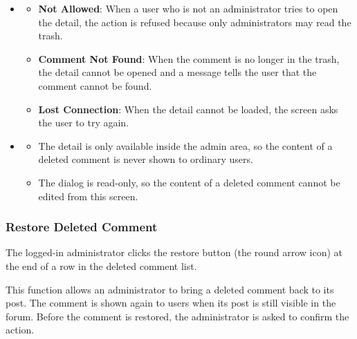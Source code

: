 \begin{itemize}[leftmargin=1.6em,topsep=4pt,itemsep=3pt,parsep=0pt,label=$\bullet$]
        \begin{itemize}[leftmargin=2.2em,topsep=2pt,itemsep=3pt,parsep=0pt,label=$\circ$]
            \item The administrator has read the complete comment and knows to which post it belongs.
            \item Nothing has changed while only viewing the comment.
        \end{itemize}
    \item {}
        \begin{itemize}[leftmargin=2.2em,topsep=2pt,itemsep=3pt,parsep=0pt,label=$\circ$]
            \item \textbf{Not Allowed}: When a user who is not an administrator tries to open the detail, the action is refused because only administrators may read the trash.
            \item \textbf{Comment Not Found}: When the comment is no longer in the trash, the detail cannot be opened and a message tells the user that the comment cannot be found.
            \item \textbf{Lost Connection}: When the detail cannot be loaded, the screen asks the user to try again.
        \end{itemize}
    \item {}
        \begin{itemize}[leftmargin=2.2em,topsep=2pt,itemsep=3pt,parsep=0pt,label=$\circ$]
            \item The detail is only available inside the admin area, so the content of a deleted comment is never shown to ordinary users.
            \item The dialog is read-only, so the content of a deleted comment cannot be edited from this screen.
        \end{itemize}
\end{itemize}


\subsubsection{Restore Deleted Comment}

 The logged-in administrator clicks the restore button (the round arrow icon) at the end of a row in the deleted comment list.

 This function allows an administrator to bring a deleted comment back to its post. The comment is shown again to users when its post is still visible in the forum. Before the comment is restored, the administrator is asked to confirm the action.

